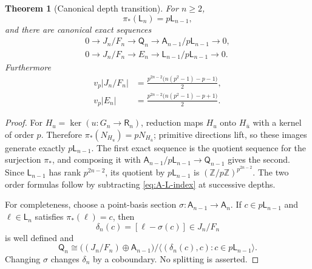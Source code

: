 \documentclass[12pt,a4paper]{article}
\newtheorem{theorem}{Theorem}[section]
\theoremstyle{definition}
\newcommand{\Z}{\mathbb Z}
\newcommand{\R}{\mathsf R}
\newcommand{\A}{\mathsf A}
\newcommand{\LL}{\mathsf L}
\newcommand{\QQ}{\mathsf Q}
\newcommand{\vp}{v_p}
\begin{document}
\begin{theorem}[Canonical depth transition]
\label{thm:canonical-depth-transition}
For $n\geq2$,
\[
 \pi_*(\LL_n)=p\LL_{n-1},
\]
and there are canonical exact sequences
\begin{gather}
 0\longrightarrow J_n/F_n\longrightarrow\QQ_n
 \longrightarrow \A_{n-1}/p\LL_{n-1}\longrightarrow0,
 \label{eq:first-depth-seq}\\
 0\longrightarrow J_n/F_n\longrightarrow E_n
 \longrightarrow \LL_{n-1}/p\LL_{n-1}\longrightarrow0.
 \label{eq:second-depth-seq}
\end{gather}
Furthermore
\begin{align*}
 \vp|J_n/F_n|&=
 \frac{p^{2n-2}\bigl(n(p^2-1)-p-1\bigr)}2,\\
 \vp|E_n|&=
 \frac{p^{2n-2}\bigl(n(p^2-1)-p+1\bigr)}2.
\end{align*}
\end{theorem}

\begin{proof}
For $H_u=\ker(u:G_n\to\R_n)$, reduction maps $H_u$ onto
$H_{\bar u}$ with a kernel of order $p$.  Therefore
$\pi_*(N_{H_u})=pN_{H_{\bar u}}$; primitive directions lift, so these images
generate exactly $p\LL_{n-1}$.  The first exact sequence is the quotient
sequence for the surjection $\pi_*$, and composing it with
$\A_{n-1}/p\LL_{n-1}\to\QQ_{n-1}$ gives the second.  Since $\LL_{n-1}$ has
rank $p^{2n-2}$, its quotient by $p\LL_{n-1}$ is
$(\Z/p\Z)^{p^{2n-2}}$.  The two order formulas follow by subtracting
\eqref{eq:A-L-index} at successive depths.

For completeness, choose a point-basis section
$\sigma:\A_{n-1}\to\A_n$.  If $c\in p\LL_{n-1}$ and
$\ell\in\LL_n$ satisfies $\pi_*(\ell)=c$, then
\[
 \delta_n(c)=[\ell-\sigma(c)]\in J_n/F_n
\]
is well defined and
\[
 \QQ_n\cong
 \bigl((J_n/F_n)\oplus\A_{n-1}\bigr)
 \big/\langle(\delta_n(c),c):c\in p\LL_{n-1}\rangle.
\]
Changing $\sigma$ changes $\delta_n$ by a coboundary.  No splitting is
asserted.
\end{proof}
\end{document}
